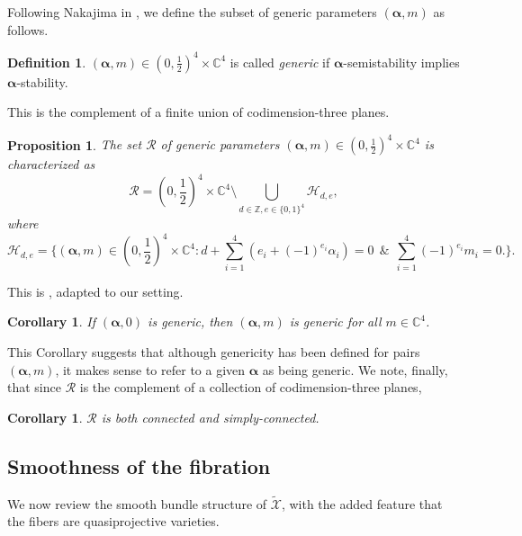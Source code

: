 \documentclass[12pt,letterpaper,reqno]{amsart}
\def\mathbf#1{#1}%
\newtheorem{cor}[thm]{Corollary}
\newtheorem{prop}[thm]{Proposition}
\theoremstyle{remark}
\theoremstyle{definition}
\newtheorem{defn}[thm]{Definition}
\numberwithin{thm}{section}
\numberwithin{equation}{section}
\numberwithin{figure}{section}
\newcommand{\C}{\ensuremath{\mathbb C}}
\newcommand{\Z}{\ensuremath{\mathbb Z}}
\newcommand{\tcalX}{\widetilde{\mathcal X}}
\newcommand{\bsa}{\boldsymbol{\alpha}}
\newcommand{\bfm}{\mathbf{m}}
\begin{document}
Following Nakajima in \cite{Nakajima}, we define the subset of generic parameters $(\boldsymbol{\alpha}, \mathbf{m})$ as follows. 
\begin{defn}\label{defn:gen1}
$(\boldsymbol{\alpha}, \mathbf{m}) \in (0, \frac12)^4 \times \C^4$ is called \emph{generic} if $\boldsymbol{\alpha}$-semistability implies $\boldsymbol{\alpha}$-stability.
\end{defn}
This is the complement of a finite union of codimension-three planes.
\begin{prop}\label{prop:generic}
The set $\mathcal R$ of generic parameters $(\boldsymbol{\alpha}, \mathbf{m}) \in (0, \frac12)^4 \times \C^4$ is characterized as 
\begin{equation}\label{eq:R}
\mathcal{R} = (0, \textstyle\frac12)^4 \times \C^4 \setminus \bigcup_{d \in \Z, \mathbf{e} \in \{0, 1\}^4} \mathcal{H}_{d, \mathbf{e}}, 
\end{equation}
where 
\begin{equation}
\mathcal{H}_{d, \mathbf{e}} = \{  (\boldsymbol{\alpha}, \mathbf{m}) \in (0, \textstyle \frac12)^4 \times \C^4 :   
d + \sum_{i=1}^4 (e_i + (-1)^{e_i} \alpha_i)  =0  \ \   \&  \ \    \sum_{i=1}^4 (-1)^{e_i} m_i = 0.\}.
\label{Nakajimagenericm} 
\end{equation}
\end{prop}
This is \cite[Lemma 2.4]{Nakajima}, adapted to our setting.
\begin{cor}
If $(\bsa, \mathbf{0})$ is generic, then $(\bsa, \mathbf{m})$  is generic for all $\bfm \in \mathbb{C}^4$.
\end{cor}
This Corollary suggests that although genericity has been defined for pairs $(\bsa, \bfm)$, it makes sense to refer to a given $\bsa$ as being generic.
We note, finally, that since $\mathcal R$ is the complement of a collection of codimension-three planes, 
\begin{cor}
$\mathcal{R}$ is both connected and simply-connected.
\end{cor}

\subsection{Smoothness of the fibration} \label{sec:bundle} 
We now review the smooth bundle structure of $\tcalX$, with the added feature that the fibers are quasiprojective varieties.
\end{document}
